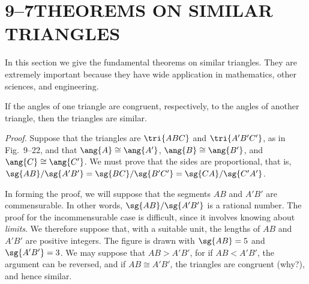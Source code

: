 \documentclass[11pt]{book}
\theoremstyle{bkplain}
\theoremstyle{XIplainnote}
\theoremstyle{bkplain}
\theoremstyle{bkplain}
\begin{document}
\section*{9--7\quad THEOREMS ON SIMILAR TRIANGLES}

In this section we give the fundamental theorems on similar triangles. They are
extremely important because they have wide application in mathematics, other
sciences, and engineering.

\begin{theorem}
If the angles of one triangle are congruent, respectively, to the angles of
another triangle, then the triangles are similar.
\end{theorem}

\noindent\emph{Proof.} Suppose that the triangles are $\tri{ABC}$ and
$\tri{A'B'C'}$, as in Fig.~9--22, and that $\ang{A} \cong \ang{A'}$,
$\ang{B} \cong \ang{B'}$, and $\ang{C} \cong \ang{C'}$. We must prove that the
sides are proportional, that is, $\sg{AB}/\sg{A'B'} = \sg{BC}/\sg{B'C'} =
\sg{CA}/\sg{C'A'}$.

\FIGIXTWENTYTWO

In forming the proof, we will suppose that the segments $AB$ and $A'B'$ are
commensurable. In other words, $\sg{AB}/\sg{A'B'}$ is a rational number. The
proof for the incommensurable case is difficult, since it involves knowing about
\emph{limits}. We therefore suppose that, with a suitable unit, the lengths of
$AB$ and $A'B'$ are positive integers. The figure is drawn with $\sg{AB} = 5$ and
$\sg{A'B'} = 3$. We may suppose that $AB > A'B'$, for if $AB < A'B'$, the
argument can be reversed, and if $AB \cong A'B'$, the triangles are congruent
(why?), and hence similar.
\end{document}

